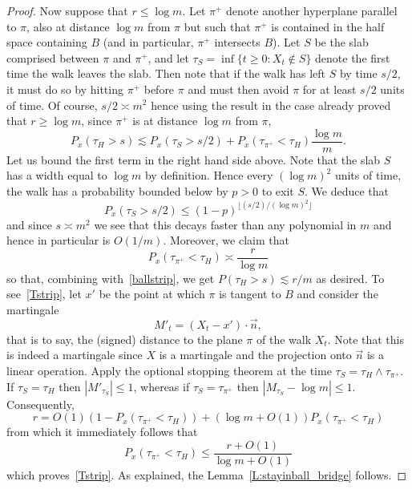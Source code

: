 \documentclass[10pt]{amsart}
\theoremstyle{definition}\newtheorem{defi}[theo]{Definition}\newtheorem{rema}[theo]{Remark}\newtheorem{exam}[theo]{Example}\newtheorem{exem}[theo]{Example}\newtheorem{nota}[theo]{Notation}
\newcommand{\Pmh}{P}
\begin{document}
\begin{proof}
Now suppose that $r \le \log m$. Let $\pi^+$ denote another hyperplane parallel to $\pi$, also at distance $\log m$ from $\pi$ but such that $\pi^+$ is contained in the half space containing $B$ (and in particular, $\pi^+$ intersects $B$). Let $S$ be the slab comprised between $\pi $ and $\pi^+$, and let $\tau_S = \inf \{ t \ge 0: X_t \notin S\}$ denote the first time the walk leaves the slab. Then note that if the walk has left $S$ by time $s/2$, it must do so by hitting $\pi^+$ before $\pi$ and must then avoid $\pi$ for at least $s/2$ units of time. Of course, $s/2 \asymp m^2$ hence using the result in the case already proved that $r \ge \log m$, since $\pi^+$ is at distance $\log m$ from $\pi$,
\begin{equation}\label{ballstrip}
\Pmh_x(\tau_H >s) \lesssim \Pmh_x(\tau_S > s/2) + \Pmh_x(\tau_{\pi^+} < \tau_H) \frac{\log m}{m}.
\end{equation}
Let us bound the first term in the right hand side above. Note that the slab $S$ has a width equal to $\log m$ by definition. Hence every $(\log m)^2$ units of time, the walk has a probability bounded below by $p>0$ to exit $S$. We deduce that
\[
\Pmh_x(\tau_S > s/2) \le (1-p)^{\lfloor (s/2)/(\log m)^2\rfloor }
\]
and since $s \asymp m^2$ we see that this decays faster than any polynomial in $m$ and hence in particular is $O(1/m)$. Moreover, we claim that
\begin{equation}\label{Tstrip}
\Pmh_x(\tau_{\pi^+} < \tau_H) \asymp \frac{r}{\log m}
\end{equation}
so that, combining with~\eqref{ballstrip}, we get $\Pmh(\tau_H >s) \lesssim r/m$ as desired. To see~\eqref{Tstrip}, let $x'$ be the point at which $\pi$ is tangent to $B$ and consider the martingale
\[
M'_t = (X_t - x') \cdot \vec{n},
\]
that is to say, the (signed) distance to the plane $\pi$ of the walk $X_t$. Note that this is indeed a martingale since $X$ is a martingale and the projection onto $\vec{n}$ is a linear operation. Apply the optional stopping theorem at the time $\tau_S = \tau_H \wedge \tau_{\pi^+}$. If $\tau_S = \tau_H$ then $|M'_{\tau_S} | \le 1 $, whereas if $\tau_S = \tau_{\pi^+}$ then $|M_{\tau_S}- \log m |\le 1$. Consequently,
\[
r = O(1) (1- \Pmh_x (\tau_{\pi^+} < \tau_H)) + (\log m + O(1)) \Pmh_x(\tau_{\pi^+} < \tau_H)
\]
from which it immediately follows that
\[
\Pmh_x(\tau_{\pi^+} < \tau_H) \le \frac{r + O(1)}{\log m + O(1)}
\]
which proves~\eqref{Tstrip}. As explained, the Lemma~\ref{L:stayinball_bridge} follows.
\end{proof}
\end{document}
